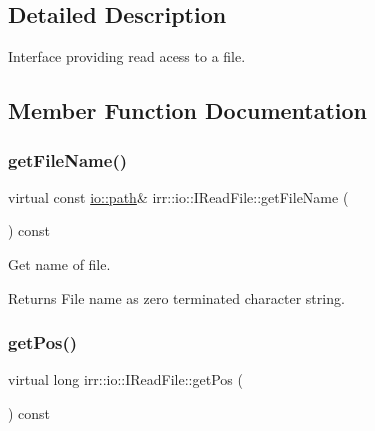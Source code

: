 \subsection{Detailed Description}
Interface providing read acess to a file. 

\subsection{Member Function Documentation}
\mbox{\label{classirr_1_1io_1_1IReadFile_a73b9c884319d2e4b0ff9a7ea15cbf316}} 
\subsubsection{\texorpdfstring{get\+File\+Name()}{getFileName()}}
{\footnotesize\ttfamily virtual const \hyperlink{namespaceirr_1_1io_ab1bdc45edb3f94d8319c02bc0f840ee1}{io\+::path}\& irr\+::io\+::\+I\+Read\+File\+::get\+File\+Name (\begin{DoxyParamCaption}{ }\end{DoxyParamCaption}) const\hspace{0.3cm}{\ttfamily [pure virtual]}}



Get name of file. 

\begin{DoxyReturn}{Returns}
File name as zero terminated character string. 
\end{DoxyReturn}
\mbox{\label{classirr_1_1io_1_1IReadFile_aeee143ee38871c30f240c025b100941d}} 
\subsubsection{\texorpdfstring{get\+Pos()}{getPos()}}
{\footnotesize\ttfamily virtual long irr\+::io\+::\+I\+Read\+File\+::get\+Pos (\begin{DoxyParamCaption}{ }\end{DoxyParamCaption}) const\hspace{0.3cm}{\ttfamily [pure virtual]}}



